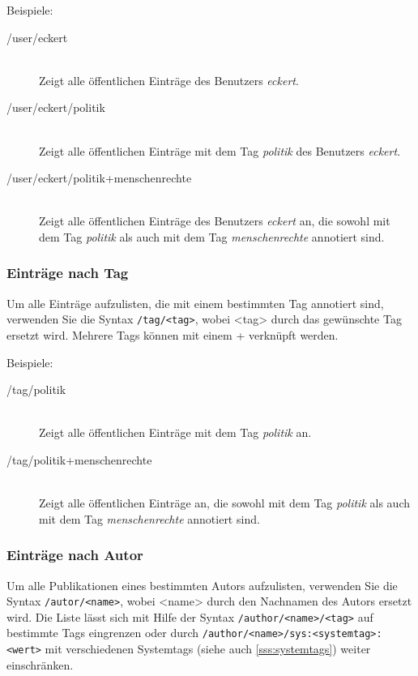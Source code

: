 Beispiele:
\begin{description}
    \item [/user/eckert] \hfill \\ 
    Zeigt alle öffentlichen Einträge des Benutzers \textit{eckert}.
    \item [/user/eckert/politik] \hfill \\
    Zeigt alle öffentlichen Einträge mit dem Tag \textit{politik} des Benutzers \textit{eckert}.
    \item [/user/eckert/politik+menschenrechte] \hfill \\
    Zeigt alle öffentlichen Einträge des Benutzers \textit {eckert} an, die sowohl mit dem Tag \textit{politik} als auch mit dem Tag \textit{menschenrechte} annotiert sind.
\end{description}

\subsubsection*{Einträge nach Tag}
\label{sss:nachTag}
Um alle Einträge aufzulisten, die mit einem bestimmten Tag annotiert sind, verwenden Sie die Syntax \texttt{/tag/<tag>}, wobei <tag> durch das gewünschte Tag ersetzt wird. Mehrere Tags können mit einem + verknüpft werden.

Beispiele:
\begin{description}
    \item [/tag/politik] \hfill \\
    Zeigt alle öffentlichen Einträge mit dem Tag \textit{politik} an.
    \item [/tag/politik+menschenrechte] \hfill \\
    Zeigt alle öffentlichen Einträge an, die sowohl mit dem Tag \textit{politik} als auch mit dem Tag \textit{menschenrechte} annotiert sind.
\end{description}

\subsubsection*{Einträge nach Autor}
\label{sss:nachAutor}

Um alle Publikationen eines bestimmten Autors aufzulisten, verwenden Sie die Syntax \texttt{/autor/<name>}, wobei <name> durch den Nachnamen des Autors ersetzt wird. Die Liste lässt sich mit Hilfe der Syntax \texttt{/author/<name>/<tag>} auf bestimmte Tags eingrenzen oder durch \texttt{/author/<name>/sys:<systemtag>:<wert>} mit verschiedenen Systemtags (siehe auch \autoref{sss:systemtags}) weiter einschränken.

